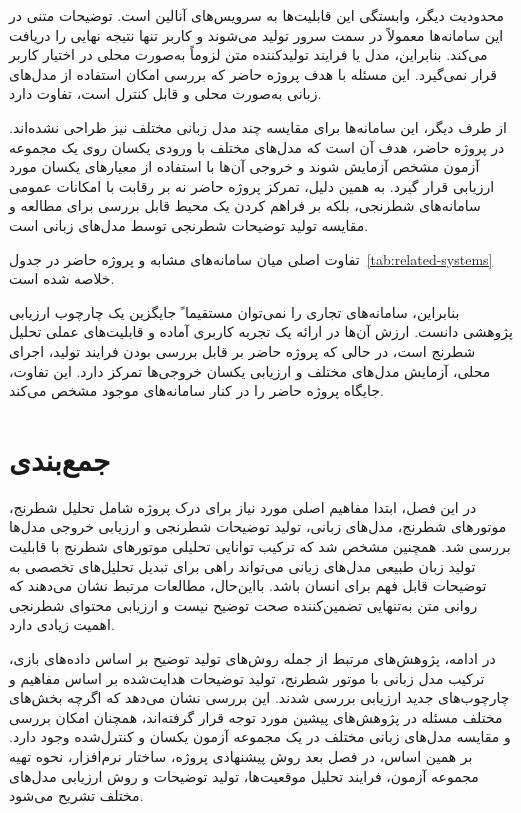 محدودیت دیگر، وابستگی این قابلیت‌ها به سرویس‌های آنالین است. توضیحات متنی در این سامانه‌ها معمولاً در سمت سرور تولید می‌شوند و کاربر تنها نتیجه نهایی را دریافت می‌کند. بنابراین، مدل یا فرایند تولیدکننده متن لزوماً به‌صورت محلی در اختیار کاربر قرار نمی‌گیرد. این مسئله با هدف پروژه حاضر که بررسی امکان استفاده از مدل‌های زبانی به‌صورت محلی و قابل کنترل است، تفاوت دارد.

از طرف دیگر، این سامانه‌ها برای مقایسه چند مدل زبانی مختلف نیز طراحی نشده‌اند. در پروژه حاضر، هدف آن است که مدل‌های مختلف با ورودی یکسان روی یک مجموعه آزمون مشخص آزمایش شوند و خروجی آن‌ها با استفاده از معیارهای یکسان مورد ارزیابی قرار گیرد. به همین دلیل، تمرکز پروژه حاضر نه بر رقابت با امکانات عمومی سامانه‌های شطرنجی، بلکه بر فراهم کردن یک محیط قابل بررسی برای مطالعه و مقایسه تولید توضیحات شطرنجی توسط مدل‌های زبانی است.

تفاوت اصلی میان سامانه‌های مشابه و پروژه حاضر در جدول~\ref{tab:related-systems} خلاصه شده است.



بنابراین، سامانه‌های تجاری را نمی‌توان مستقیما ً جایگزین یک چارچوب ارزیابی پژوهشی دانست. ارزش آن‌ها در ارائه یک تجربه کاربری آماده و قابلیت‌های عملی تحلیل شطرنج است، در حالی که پروژه حاضر بر قابل بررسی بودن فرایند تولید، اجرای محلی، آزمایش مدل‌های مختلف و ارزیابی یکسان خروجی‌ها تمرکز دارد. این تفاوت، جایگاه پروژه حاضر را در کنار سامانه‌های موجود مشخص می‌کند.

\section{جمع‌بندی}

در این فصل، ابتدا مفاهیم اصلی مورد نیاز برای درک پروژه شامل تحلیل شطرنج، موتورهای شطرنج، مدل‌های زبانی، تولید توضیحات شطرنجی و ارزیابی خروجی مدل‌ها بررسی شد. همچنین مشخص شد که ترکیب توانایی تحلیلی موتورهای شطرنج با قابلیت تولید زبان طبیعی مدل‌های زبانی می‌تواند راهی برای تبدیل تحلیل‌های تخصصی به توضیحات قابل فهم برای انسان باشد. بااین‌حال، مطالعات مرتبط نشان می‌دهند که روانی متن به‌تنهایی تضمین‌کننده صحت توضیح نیست و ارزیابی محتوای شطرنجی اهمیت زیادی دارد.

در ادامه، پژوهش‌های مرتبط از جمله روش‌های تولید توضیح بر اساس داده‌های بازی، ترکیب مدل زبانی با موتور شطرنج، تولید توضیحات هدایت‌شده بر اساس مفاهیم و چارچوب‌های جدید ارزیابی بررسی شدند. این بررسی نشان می‌دهد که اگرچه بخش‌های مختلف مسئله در پژوهش‌های پیشین مورد توجه قرار گرفته‌اند، همچنان امکان بررسی و مقایسه مدل‌های زبانی مختلف در یک مجموعه آزمون یکسان و کنترل‌شده وجود دارد. بر همین اساس، در فصل بعد روش پیشنهادی پروژه، ساختار نرم‌افزار، نحوه تهیه مجموعه آزمون، فرایند تحلیل موقعیت‌ها، تولید توضیحات و روش ارزیابی مدل‌های مختلف تشریح می‌شود.
